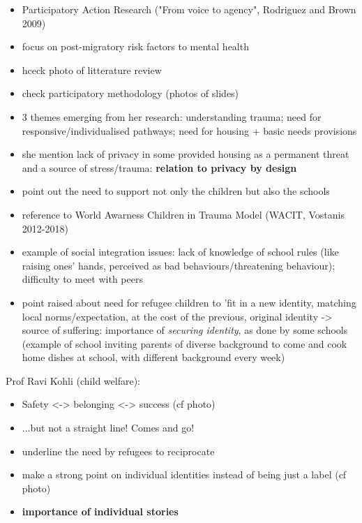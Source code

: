 \documentclass[]{article}
\begin{document}
\begin{itemize}
    \item Participatory Action Research ("From voice to agency", Rodriguez and
        Brown 2009)
    \item focus on post-migratory risk factors to mental health
    \item hceck photo of litterature review
    \item check participatory methodology (photos of slides)
    \item 3 themes emerging from her research: understanding trauma; need for
        responsive/individualised pathways; need for housing + basic needs
        provisions
    \item she mention lack of privacy in some provided housing as a permanent
        threat and a source of stress/trauma: \textbf{relation to privacy by
        design}
    \item point out the need to support not only the children but also the
        schools
    \item reference to World Awarness Children in Trauma Model (WACIT, Vostanis
        2012-2018)
    \item example of social integration issues: lack of knowledge of school
        rules (like raising ones' hands, perceived as bad behaviours/threatening
        behaviour); difficulty to meet with peers
    \item point raised about need for refugee children to 'fit in a new
        identity, matching local norms/expectation, at the cost of the previous,
        original identity -> source of suffering: importance of \emph{securing
        identity}, as done by some schools (example of school inviting parents
        of diverse background to come and cook home dishes at school, with
        different background every week)
\end{itemize}


Prof Ravi Kohli (child welfare):

\begin{itemize}
    \item Safety <-> belonging <-> success (cf photo)
    \item ...but not a straight line! Comes and go!
    \item underline the need by refugees to reciprocate
    \item make a strong point on individual identities instead of being just a label (cf
        photo)
    \item \textbf{importance of individual stories}
\end{itemize}
\end{document}
